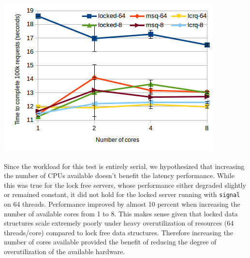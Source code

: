 \documentclass[twoside,10pt]{article}
\newenvironment{Figure}
  {\par\medskip\noindent\minipage{\linewidth}}
  {\endminipage\par\medskip}
\begin{document}
\begin{multicols}{2}
\begin{Figure}
  \includegraphics[width=\linewidth]{img/latencyncores.png}
\end{Figure}

Since the workload for this test is entirely serial, we hypothesized that
increasing the number of CPUs available doesn't benefit the latency
performance. While this was true for the lock free servers, whose performance
either degraded slightly or remained constant, it did not hold for the locked server running with \verb+signal+ on 64 threads. Performance improved by
almost 10 percent when increasing the number of available cores from 1 to 8. 
This makes sense given that locked data structures scale extremely poorly under
heavy overutilization of resources (64 threads/core) compared to lock free 
data structures. Therefore increasing the number of cores available provided 
the benefit of reducing the degree of overutilization of the available hardware. 


\end{multicols}
\end{document}

